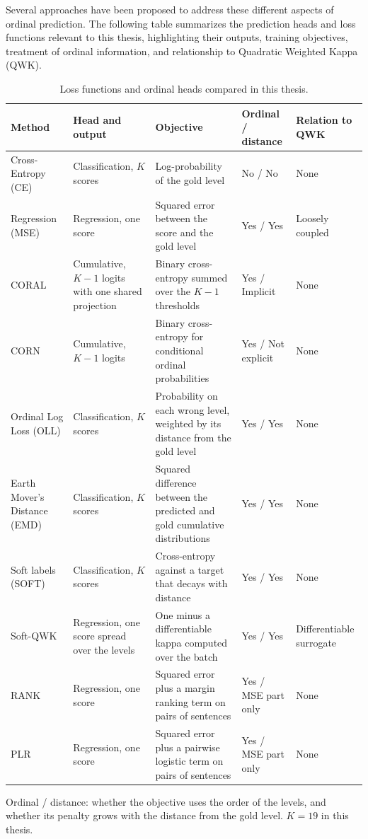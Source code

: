 \documentclass[12pt]{report}
\begin{document}
Several approaches have been proposed to address these different aspects of ordinal prediction. The following table summarizes the prediction heads and loss functions relevant to this thesis, highlighting their outputs, training objectives, treatment of ordinal information, and relationship to Quadratic Weighted Kappa (QWK).
\begin{table}[H]
\centering
\small
\caption{Loss functions and ordinal heads compared in this thesis.}
\label{tab:ordinal_methods}
\vspace{3mm}
\setlength{\tabcolsep}{4pt}
\renewcommand{\arraystretch}{1.2}
\begin{tabular}{p{2.5cm} p{2.3cm} p{3.9cm} p{1.4cm} p{1.6cm}}
\toprule
\textbf{Method} & \textbf{Head and output} & \textbf{Objective} & \textbf{Ordinal / distance} & \textbf{Relation to QWK} \\
\midrule
Cross-Entropy (CE) & Classification, $K$ scores & Log-probability of the gold level & No / No & None \\
Regression (MSE) \cite{elmadani2025barec} & Regression, one score & Squared error between the score and the gold level & Yes / Yes & Loosely coupled \\
CORAL \cite{cao2020coral} & Cumulative, $K{-}1$ logits with one shared projection & Binary cross-entropy summed over the $K{-}1$ thresholds & Yes / Implicit & None \\
CORN \cite{shi2023deep} & Cumulative, $K{-}1$ logits & Binary cross-entropy for conditional ordinal probabilities & Yes / Not explicit & None \\
Ordinal Log Loss (OLL) \cite{castagnos2022ordinal} & Classification, $K$ scores & Probability on each wrong level, weighted by its distance from the gold level & Yes / Yes & None \\
Earth Mover's Distance (EMD) \cite{hou2017emd} & Classification, $K$ scores & Squared difference between the predicted and gold cumulative distributions & Yes / Yes & None \\
Soft labels (SOFT) \cite{bertinetto2020soft} & Classification, $K$ scores & Cross-entropy against a target that decays with distance & Yes / Yes & None \\
Soft-QWK \cite{delatorre2018wkl,diaz2019softlabels,trigui2025stbw} & Regression, one score spread over the levels & One minus a differentiable kappa computed over the batch & Yes / Yes & Differentiable surrogate \\
RANK \cite{trokhymovych2024open} & Regression, one score & Squared error plus a margin ranking term on pairs of sentences & Yes / MSE part only & None \\
PLR \cite{lee2022neural} & Regression, one score & Squared error plus a pairwise logistic term on pairs of sentences & Yes / MSE part only & None \\
\bottomrule
\end{tabular}

\vspace{0.15cm}
{\footnotesize Ordinal / distance: whether the objective uses the order of the levels, and whether its penalty grows with the distance from the gold level. $K = 19$ in this thesis.}
\end{table}
\end{document}
